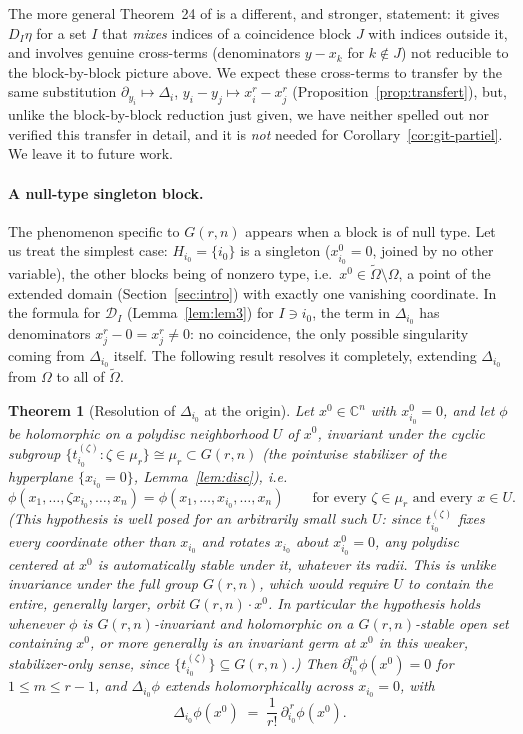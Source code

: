 \documentclass[11pt]{article}
\newtheorem{theorem}{Theorem}[section]
\theoremstyle{remark}
\newcommand{\CC}{\mathbb{C}}
\begin{document}
The more general Theorem~24 of \cite{Ze} is a different, and stronger, statement: it gives $D_I\eta$ for a set $I$ that \emph{mixes} indices of a coincidence block $J$ with indices outside it, and involves genuine cross-terms (denominators $y-x_k$ for $k\notin J$) not reducible to the block-by-block picture above. We expect these cross-terms to transfer by the same substitution $\partial_{y_i}\mapsto\Delta_i$, $y_i-y_j\mapsto x_i^r-x_j^r$ (Proposition~\ref{prop:transfert}), but, unlike the block-by-block reduction just given, we have neither spelled out nor verified this transfer in detail, and it is \emph{not} needed for Corollary~\ref{cor:git-partiel}. We leave it to future work.

\paragraph{A null-type singleton block.} The phenomenon specific to $G(r,n)$ appears when a block is of null type. Let us treat the simplest case: $H_{i_0}=\{i_0\}$ is a singleton ($x_{i_0}^0=0$, joined by no other variable), the other blocks being of nonzero type, i.e.\ $x^0\in\widetilde\Omega\setminus\Omega$, a point of the extended domain (Section~\ref{sec:intro}) with exactly one vanishing coordinate. In the formula for $\mathcal D_I$ (Lemma~\ref{lem:lem3}) for $I\ni i_0$, the term in $\Delta_{i_0}$ has denominators $x_j^r-0=x_j^r\ne0$: no coincidence, the only possible singularity coming from $\Delta_{i_0}$ itself. The following result resolves it completely, extending $\Delta_{i_0}$ from $\Omega$ to all of $\widetilde\Omega$.

\begin{theorem}[Resolution of $\Delta_{i_0}$ at the origin]\label{thm:origine}
Let $x^0\in\CC^n$ with $x_{i_0}^0=0$, and let $\phi$ be holomorphic on a polydisc neighborhood $U$ of $x^0$, invariant under the cyclic subgroup $\{t_{i_0}^{(\zeta)}:\zeta\in\mu_r\}\cong\mu_r\subset G(r,n)$ (the pointwise stabilizer of the hyperplane $\{x_{i_0}=0\}$, Lemma~\ref{lem:disc}), i.e.
\[
\phi(x_1,\dots,\zeta x_{i_0},\dots,x_n) = \phi(x_1,\dots,x_{i_0},\dots,x_n) \qquad \text{for every } \zeta\in\mu_r \text{ and every } x\in U.
\]
(This hypothesis is well posed for an \emph{arbitrarily small} such $U$: since $t_{i_0}^{(\zeta)}$ fixes every coordinate other than $x_{i_0}$ and rotates $x_{i_0}$ about $x_{i_0}^0=0$, any polydisc centered at $x^0$ is automatically stable under it, whatever its radii. This is unlike invariance under the \emph{full} group $G(r,n)$, which would require $U$ to contain the entire, generally larger, orbit $G(r,n)\cdot x^0$. In particular the hypothesis holds whenever $\phi$ is $G(r,n)$-invariant and holomorphic on a $G(r,n)$-stable open set containing $x^0$, or more generally is an invariant germ at $x^0$ in this weaker, stabilizer-only sense, since $\{t_{i_0}^{(\zeta)}\}\subseteq G(r,n)$.) Then $\partial_{i_0}^m\phi(x^0)=0$ for $1\le m\le r-1$, and $\Delta_{i_0}\phi$ extends holomorphically across $x_{i_0}=0$, with
\[
\Delta_{i_0}\phi(x^0) \;=\; \frac{1}{r!}\,\partial_{i_0}^{\,r}\phi(x^0).
\]
\end{theorem}
\end{document}
